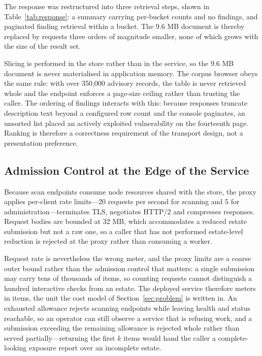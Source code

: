 \documentclass[fleqn,10pt,lineno]{wlpeerj}
\begin{document}
The response was restructured into three retrieval steps, shown in Table~\ref{tab:response}: a summary carrying per-bucket counts and no findings, and paginated finding retrieval within a bucket. The 9.6 MB document is thereby replaced by requests three orders of magnitude smaller, none of which grows with the size of the result set.



Slicing is performed in the store rather than in the service, so the 9.6 MB document is never materialised in application memory. The corpus browser obeys the same rule: with over 350,000 advisory records, the table is never retrieved whole and the endpoint enforces a page-size ceiling rather than trusting the caller. The ordering of findings interacts with this: because responses truncate description text beyond a configured row count and the console paginates, an unsorted list placed an actively exploited vulnerability on the fourteenth page. Ranking is therefore a correctness requirement of the transport design, not a presentation preference.

\subsection{Admission Control at the Edge of the Service}
Because scan endpoints consume node resources shared with the store, the proxy applies per-client rate limits---20 requests per second for scanning and 5 for administration---terminates TLS, negotiates HTTP/2 and compresses responses. Request bodies are bounded at 32 MB, which accommodates a reduced estate submission but not a raw one, so a caller that has not performed estate-level reduction is rejected at the proxy rather than consuming a worker.

Request rate is nevertheless the wrong meter, and the proxy limits are a coarse outer bound rather than the admission control that matters: a single submission may carry tens of thousands of items, so counting requests cannot distinguish a hundred interactive checks from an estate. The deployed service therefore meters in items, the unit the cost model of Section~\ref{sec:problem} is written in. An exhausted allowance rejects scanning endpoints while leaving health and status reachable, so an operator can still observe a service that is refusing work, and a submission exceeding the remaining allowance is rejected whole rather than served partially---returning the first $k$ items would hand the caller a complete-looking exposure report over an incomplete estate.
\end{document}
